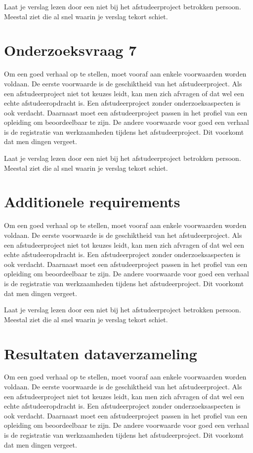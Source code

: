 		
		Laat je verslag lezen door een niet bij het afstudeerproject betrokken
		persoon. Meestal ziet die al snel waarin je verslag tekort schiet.
		\section{Onderzoeksvraag 7 }
		Om een goed verhaal op te stellen, moet vooraf aan enkele voorwaarden
		worden voldaan. De eerste voorwaarde is de geschiktheid van het
		afstudeerproject. Als een afstudeerproject niet tot keuzes leidt, kan
		men zich afvragen of dat wel een echte afstudeeropdracht is. Een
		afstudeerproject zonder onderzoeksaspecten is ook verdacht. Daarnaast
		moet een afstudeerproject passen in het profiel van een opleiding om
		beoordeelbaar te zijn. De andere voorwaarde voor goed een verhaal is
		de registratie van werkzaamheden tijdens het afstudeerproject. Dit
		voorkomt dat men dingen vergeet.
		
		
		Laat je verslag lezen door een niet bij het afstudeerproject betrokken
		persoon. Meestal ziet die al snel waarin je verslag tekort schiet.
		\section{Additionele requirements}
		Om een goed verhaal op te stellen, moet vooraf aan enkele voorwaarden
		worden voldaan. De eerste voorwaarde is de geschiktheid van het
		afstudeerproject. Als een afstudeerproject niet tot keuzes leidt, kan
		men zich afvragen of dat wel een echte afstudeeropdracht is. Een
		afstudeerproject zonder onderzoeksaspecten is ook verdacht. Daarnaast
		moet een afstudeerproject passen in het profiel van een opleiding om
		beoordeelbaar te zijn. De andere voorwaarde voor goed een verhaal is
		de registratie van werkzaamheden tijdens het afstudeerproject. Dit
		voorkomt dat men dingen vergeet.
		
		
		Laat je verslag lezen door een niet bij het afstudeerproject betrokken
		persoon. Meestal ziet die al snel waarin je verslag tekort schiet.
		\section{Resultaten dataverzameling}
		Om een goed verhaal op te stellen, moet vooraf aan enkele voorwaarden
		worden voldaan. De eerste voorwaarde is de geschiktheid van het
		afstudeerproject. Als een afstudeerproject niet tot keuzes leidt, kan
		men zich afvragen of dat wel een echte afstudeeropdracht is. Een
		afstudeerproject zonder onderzoeksaspecten is ook verdacht. Daarnaast
		moet een afstudeerproject passen in het profiel van een opleiding om
		beoordeelbaar te zijn. De andere voorwaarde voor goed een verhaal is
		de registratie van werkzaamheden tijdens het afstudeerproject. Dit
		voorkomt dat men dingen vergeet.
		
